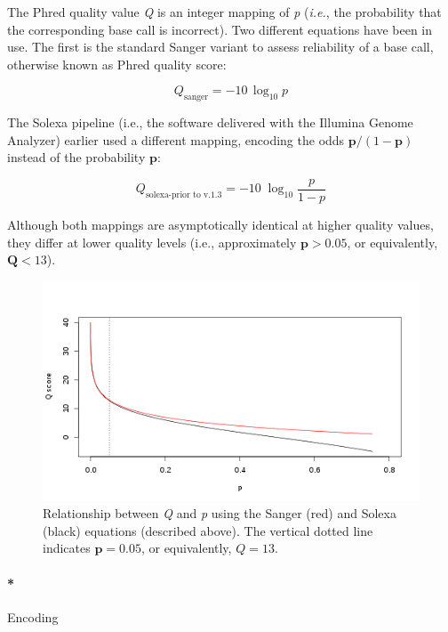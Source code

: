 \documentclass[
  letterpaper,
  DIV=11,
  numbers=noendperiod]{scrreprt}
\let\oldparagraph\paragraph
\renewcommand{\paragraph}[1]{\oldparagraph{#1}\mbox{}}
\begin{document}
The Phred quality value \emph{Q} is an integer mapping of \emph{p}
(\emph{i.e.}, the probability that the corresponding base call is
incorrect). Two different equations have been in use. The first is the
standard Sanger variant to assess reliability of a base call, otherwise
known as Phred quality score:

\[
Q_\text{sanger} = -10 \, \log_{10} p
\]

The Solexa pipeline (i.e., the software delivered with the Illumina
Genome Analyzer) earlier used a different mapping, encoding the odds
\(\mathbf{p}/(1-\mathbf{p})\) instead of the probability \(\mathbf{p}\):

\[
Q_\text{solexa-prior to v.1.3} = -10 \; \log_{10} \frac{p}{1-p}
\]

Although both mappings are asymptotically identical at higher quality
values, they differ at lower quality levels (i.e., approximately
\(\mathbf{p} > 0.05\), or equivalently, \(\mathbf{Q} < 13\)).

\begin{figure}

{\centering \includegraphics{./Probabilitymetrics.png}

}

\caption{\label{fig-Probabilitymetrics}Relationship between \emph{Q} and
\emph{p} using the Sanger (red) and Solexa (black) equations (described
above). The vertical dotted line indicates \(\mathbf{p}= 0.05\), or
equivalently, \(Q = 13\).}

\end{figure}

\hypertarget{encoding}{%
\paragraph*{Encoding}\label{encoding}}
\end{document}
